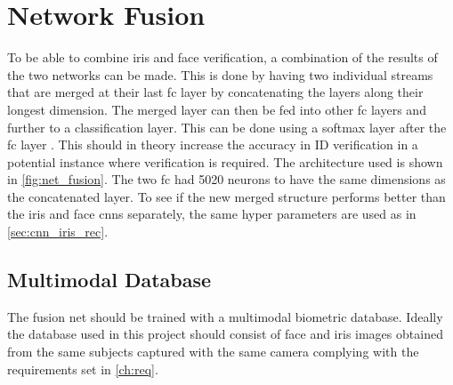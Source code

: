 \section{Network Fusion}
To be able to combine iris and face verification, a combination of the results of the two networks can be made.  This is done by having two individual streams that are merged at their last \gls{fc} layer by concatenating the layers along their longest dimension. The merged layer can then be fed into other \gls{fc} layers and further to a classification layer. This can be done using a softmax layer after the \gls{fc} layer \citep{Eitel2015}. This should in theory increase the accuracy in ID verification in a potential instance where verification is required. The architecture used is shown in \autoref{fig:net_fusion}. The two \gls{fc} had 5020 neurons to have the same dimensions as the concatenated layer. To see if the new merged structure performs better than the iris and face \gls{cnn}s separately, the same hyper parameters are used as in \autoref{sec:cnn_iris_rec}.


\subsection{Multimodal Database}
The fusion net should be trained with a multimodal biometric database. Ideally the database used in this project should consist of face and iris images obtained from the same subjects captured with the same camera complying with the requirements set in \autoref{ch:req}. 

